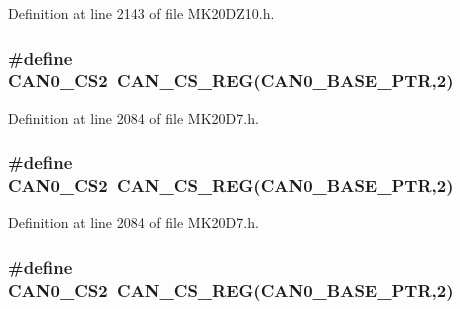 Definition at line 2143 of file M\+K20\+D\+Z10.\+h.

\subsubsection[{\texorpdfstring{C\+A\+N0\+\_\+\+C\+S2}{CAN0_CS2}}]{\setlength{\rightskip}{0pt plus 5cm}\#define C\+A\+N0\+\_\+\+C\+S2~{\bf C\+A\+N\+\_\+\+C\+S\+\_\+\+R\+EG}({\bf C\+A\+N0\+\_\+\+B\+A\+S\+E\+\_\+\+P\+TR},2)}\hypertarget{group___c_a_n___register___accessor___macros_ga08f24916807df6cd9933153eb5694808}{}\label{group___c_a_n___register___accessor___macros_ga08f24916807df6cd9933153eb5694808}


Definition at line 2084 of file M\+K20\+D7.\+h.

\subsubsection[{\texorpdfstring{C\+A\+N0\+\_\+\+C\+S2}{CAN0_CS2}}]{\setlength{\rightskip}{0pt plus 5cm}\#define C\+A\+N0\+\_\+\+C\+S2~{\bf C\+A\+N\+\_\+\+C\+S\+\_\+\+R\+EG}({\bf C\+A\+N0\+\_\+\+B\+A\+S\+E\+\_\+\+P\+TR},2)}\hypertarget{group___c_a_n___register___accessor___macros_ga08f24916807df6cd9933153eb5694808}{}\label{group___c_a_n___register___accessor___macros_ga08f24916807df6cd9933153eb5694808}


Definition at line 2084 of file M\+K20\+D7.\+h.

\subsubsection[{\texorpdfstring{C\+A\+N0\+\_\+\+C\+S2}{CAN0_CS2}}]{\setlength{\rightskip}{0pt plus 5cm}\#define C\+A\+N0\+\_\+\+C\+S2~{\bf C\+A\+N\+\_\+\+C\+S\+\_\+\+R\+EG}({\bf C\+A\+N0\+\_\+\+B\+A\+S\+E\+\_\+\+P\+TR},2)}\hypertarget{group___c_a_n___register___accessor___macros_ga08f24916807df6cd9933153eb5694808}{}\label{group___c_a_n___register___accessor___macros_ga08f24916807df6cd9933153eb5694808}


